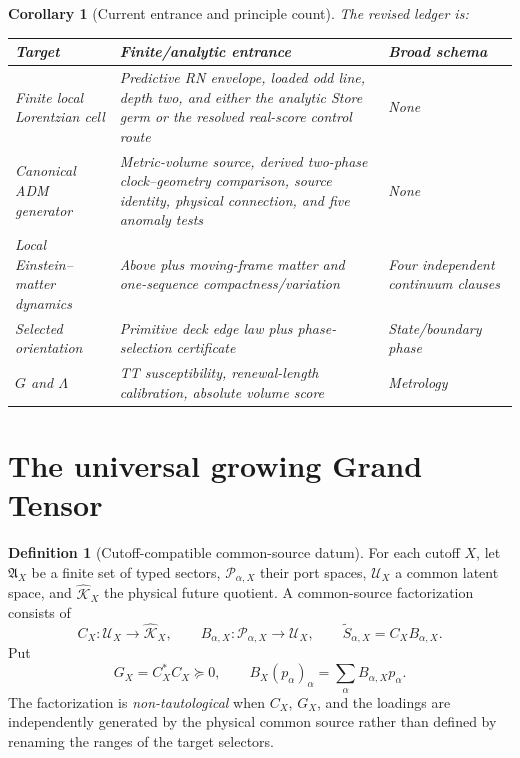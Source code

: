 \documentclass[11pt]{article}
\newtheorem{corollary}[theorem]{Corollary}
\theoremstyle{definition}
\newtheorem{definition}[theorem]{Definition}
\theoremstyle{remark}
\begin{document}
\begin{corollary}[Current entrance and principle count]
\label{cor:master-principle-count}
The revised ledger is:
\begin{center}
\small
\begin{tabularx}{0.98\textwidth}{L{0.24\textwidth}L{0.50\textwidth}L{0.16\textwidth}}
\toprule
\textbf{Target} & \textbf{Finite/analytic entrance} & \textbf{Broad schema}\\
\midrule
Finite local Lorentzian cell
& Predictive RN envelope, loaded odd line, depth two, and either the analytic
  Store germ or the resolved real-score control route
& None\\
\addlinespace
Canonical ADM generator
& Metric-volume source, derived two-phase clock--geometry comparison, source
  identity, physical connection, and five anomaly tests
& None\\
\addlinespace
Local Einstein--matter dynamics
& Above plus moving-frame matter and one-sequence compactness/variation
& Four independent continuum clauses\\
\addlinespace
Selected orientation
& Primitive deck edge law plus phase-selection certificate
& State/boundary phase\\
\addlinespace
$G$ and $\Lambda$
& TT susceptibility, renewal-length calibration, absolute volume score
& Metrology\\
\bottomrule
\end{tabularx}
\end{center}
\end{corollary}

\section{The universal growing Grand Tensor}
\label{sec:universal-grand-tensor}

\begin{definition}[Cutoff-compatible common-source datum]
\label{def:grand-datum}
For each cutoff $X$, let $\mathfrak A_X$ be a finite set of typed sectors,
$\mathcal P_{\alpha,X}$ their port spaces, $\mathcal U_X$ a common latent
space, and $\widehat{\mathcal K}_X$ the physical future quotient.  A
common-source factorization consists of
\[
 C_X:\mathcal U_X\to\widehat{\mathcal K}_X,
 \qquad
 B_{\alpha,X}:\mathcal P_{\alpha,X}\to\mathcal U_X,
 \qquad
 \widetilde S_{\alpha,X}=C_XB_{\alpha,X}.
\]
Put
\[
 G_X=C_X^*C_X\succeq0,
 \qquad
 B_X(p_\alpha)_\alpha=\sum_\alpha B_{\alpha,X}p_\alpha.
\]
The factorization is \emph{non-tautological} when $C_X$, $G_X$, and the
loadings are independently generated by the physical common source rather
than defined by renaming the ranges of the target selectors.
\end{definition}
\end{document}
